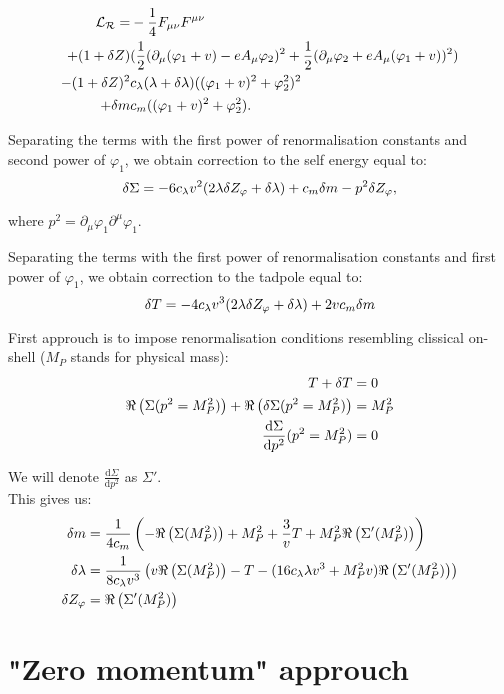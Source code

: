 \begin{align}
\mathcal{L_R} = &-\frac{1}{4}F_{\mu\nu}F^{\mu\nu} \\
+(1+ \delta Z)&(\frac{1}{2}(\partial_\mu(\varphi_1+v) - eA_\mu\varphi_2)^2
+\frac{1}{2}(\partial_\mu\varphi_2+eA_\mu(\varphi_1+v))^2) \notag \\
-(1+\delta Z)^2&c_\lambda(\lambda+\delta\lambda)((\varphi_1+v)^2+\varphi_2^2)^2  \notag \\
+ \delta m &c_m((\varphi_1+v)^2+\varphi_2^2).
\end{align}


Separating the terms with the first power of renormalisation constants and second power of 
$\varphi_1$, we obtain correction to the self energy equal to:
\begin{equation}
\delta\Sigma=-6c_\lambda v^2(2\lambda\delta Z_\varphi+\delta\lambda)+c_m\delta m-p^2\delta Z_\varphi,
\end{equation}

where $p^2 = \partial_\mu \varphi_1\partial^\mu\varphi_1$.


Separating the terms with the first power of renormalisation constants and first power of 
$\varphi_1$, we obtain correction to the tadpole equal to:
\begin{equation}
\delta T=-4c_\lambda v^3(2\lambda\delta Z_\varphi+\delta\lambda)+2vc_m\delta m
\end{equation}

First approuch is to impose renormalisation conditions resembling clissical on-shell ($M_P$ 
stands for physical mass):
\begin{align}
T+\delta T &= 0 \\
\Re\left(\Sigma(p^2=M_P^2)\right) + \Re\left(\delta\Sigma(p^2=M_P^2)\right) &= M_P^2 \\
\frac{\textrm{d}\Sigma}{\textrm{d}p^2}(p^2=M_P^2) &= 0
\end{align}

We will denote $\frac{\textrm{d}\Sigma}{\textrm{d}p^2}$ as $\Sigma'$. \\

This gives us:
\begin{align}
\delta m &= \frac{1}{4c_m}\left(-\Re\left(\Sigma(M_P^2)\right)+M_P^2+\frac{3}{v}T+M_P^2\Re\left(\Sigma'(M_P^2)\right)
\right)\\
\delta\lambda &= \frac{1}{8c_\lambda v^3}\left(v\Re\left(\Sigma(M_P^2)\right)-T-(16c_\lambda\lambda v^3+M_P^2v)\Re\left(\Sigma'(M_P^2)\right)
\right)\\
\delta Z_\varphi &= \Re\left(\Sigma'(M_P^2)\right)
\end{align}




\section{"Zero momentum" approuch}














